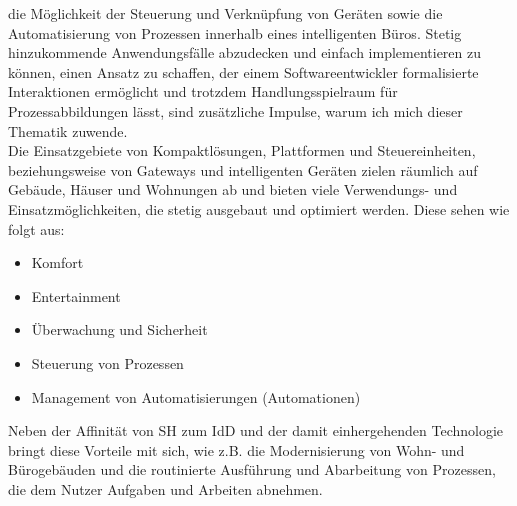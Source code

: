     die Möglichkeit der Steuerung und Verknüpfung von Geräten sowie die Automatisierung von Prozessen innerhalb eines intelligenten Büros. 
    Stetig hinzukommende Anwendungsfälle abzudecken und einfach implementieren zu können, einen Ansatz zu schaffen, der einem 
    Softwareentwickler formalisierte Interaktionen ermöglicht und trotzdem Handlungsspielraum für Prozessabbildungen lässt, sind 
    zusätzliche Impulse, warum ich mich dieser Thematik zuwende. 
    \\ 
    \linebreak
    Die Einsatzgebiete von Kompaktlösungen, Plattformen und Steuereinheiten, beziehungsweise von Gateways und intelligenten Geräten zielen räumlich 
    auf Gebäude, Häuser und Wohnungen ab und bieten viele Verwendungs- und Einsatzmöglichkeiten, die stetig ausgebaut und optimiert werden. 
    Diese sehen wie folgt aus: 
    \begin{itemize}
        \item Komfort
        \item Entertainment
        \item Überwachung und Sicherheit
        \item Steuerung von Prozessen
        \item Management von Automatisierungen (Automationen)
    \end{itemize}    
    Neben der Affinität von \acl{SH} zum \acl{IdD} und der damit einhergehenden Technologie bringt diese Vorteile mit sich, wie z.B. 
    die Modernisierung von Wohn- und Bürogebäuden und die routinierte Ausführung und Abarbeitung von Prozessen, die dem Nutzer 
    Aufgaben und Arbeiten abnehmen.
\pagebreak
